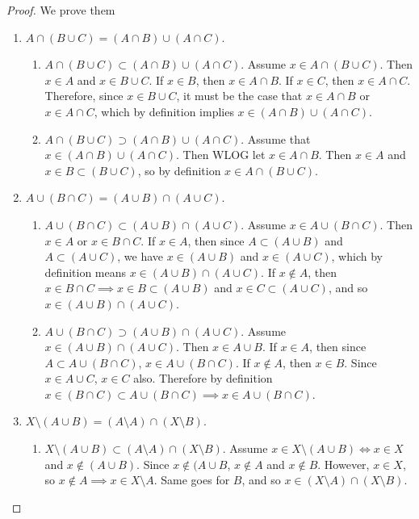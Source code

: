   \begin{proof}
    We prove them 
    \begin{enumerate}
      \item $A \cap (B \cup C) = (A \cap B) \cup (A \cap C)$. 
        \begin{enumerate}
          \item $A \cap (B \cup C) \subset (A \cap B) \cup (A \cap C)$. Assume $x \in A \cap (B \cup C)$. Then $x \in A$ and $x \in B \cup C$. If $x \in B$, then $x \in A \cap B$. If $x \in C$, then $x \in A \cap C$. Therefore, since $x \in B \cup C$, it must be the case that $x \in A \cap B$ or $x \in A \cap C$, which by definition implies $x \in (A \cap B) \cup (A \cap C)$. 

          \item $A \cap (B \cup C) \supset (A \cap B) \cup (A \cap C)$. Assume that $x \in (A \cap B) \cup (A \cap C)$. Then WLOG let $x \in A \cap B$. Then $x \in A$ and $x \in B \subset (B \cup C)$, so by definition $x \in A \cap (B \cup C)$. 
        \end{enumerate}

      \item $A \cup (B \cap C) = (A \cup B) \cap (A \cup C)$.
        \begin{enumerate}
          \item $A \cup (B \cap C) \subset (A \cup B) \cap (A \cup C)$. Assume $x \in A \cup(B \cap C)$. Then $x \in A$ or $x \in B \cap C$. If $x \in A$, then since $A \subset (A \cup B)$ and $A \subset (A \cup C)$, we have $x \in (A \cup B)$ and $x \in (A \cup C)$, which by definition means $x \in (A \cup B) \cap (A \cup C)$. If $x \not\in A$, then $x \in B \cap C \implies x \in B \subset (A \cup B)$ and $x \in C \subset (A \cup C)$, and so $x \in (A \cup B) \cap (A \cup C)$. 

          \item $A \cup (B \cap C) \supset (A \cup B) \cap (A \cup C)$. Assume $x \in (A \cup B) \cap (A \cup C)$. Then $x \in A \cup B$. If $x \in A$, then since $A \subset A \cup (B \cap C)$, $x \in A \cup (B \cap C)$. If $x \not\in A$, then $x \in B$. Since $x \in A \cup C$, $x \in C$ also. Therefore by definition $x \in (B \cap C) \subset A \cup (B \cap C) \implies x \in A \cup (B \cap C)$. 
        \end{enumerate}

      \item $X \setminus (A \cup B) = (A \setminus A) \cap (X \setminus B)$.
        \begin{enumerate}
          \item $X \setminus (A \cup B) \subset (A \setminus A) \cap (X \setminus B)$. Assume $x \in X \setminus (A \cup B) \iff x \in X$ and $x \not\in (A \cup B)$. Since $x \not\in (A \cup B$, $x \not\in A$ and $x \not\in B$. However, $x \in X$, so $x \not\in A \implies x \in X \setminus A$. Same goes for $B$, and so $x \in (X \setminus A) \cap (X \setminus B)$. 


\end{enumerate}
\end{enumerate}
\end{proof}
